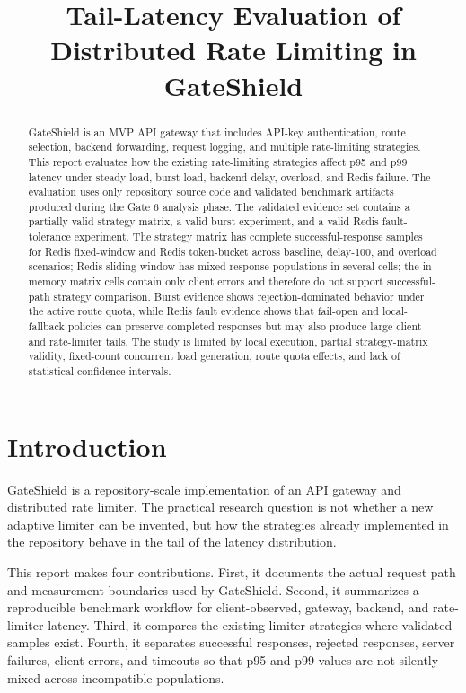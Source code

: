\documentclass[conference]{IEEEtran}
\title{Tail-Latency Evaluation of Distributed Rate Limiting in GateShield}
\author{
\IEEEauthorblockN{Dang Phan Bao Huy}
\IEEEauthorblockA{GateShield MVP API Gateway\\
Repository-based experimental report}
}
\newcommand{\projecturl}{https://github.com/HuyBaoo1/Distributed-System-API-gateway-Dang-Phan-Bao-Huy}
\begin{document}
\maketitle

\begin{center}
\href{\projecturl}{}
\quad
\href{\projecturl/blob/main/README.md}{}
\quad
\href{\projecturl/blob/main/GATESHIELD_GUIDE_VI.md}{}
\end{center}

\begin{abstract}
GateShield is an MVP API gateway that includes API-key authentication, route selection, backend forwarding, request logging, and multiple rate-limiting strategies. This report evaluates how the existing rate-limiting strategies affect p95 and p99 latency under steady load, burst load, backend delay, overload, and Redis failure. The evaluation uses only repository source code and validated benchmark artifacts produced during the Gate 6 analysis phase. The validated evidence set contains a partially valid strategy matrix, a valid burst experiment, and a valid Redis fault-tolerance experiment. The strategy matrix has complete successful-response samples for Redis fixed-window and Redis token-bucket across baseline, delay-100, and overload scenarios; Redis sliding-window has mixed response populations in several cells; the in-memory matrix cells contain only client errors and therefore do not support successful-path strategy comparison. Burst evidence shows rejection-dominated behavior under the active route quota, while Redis fault evidence shows that fail-open and local-fallback policies can preserve completed responses but may also produce large client and rate-limiter tails. The study is limited by local execution, partial strategy-matrix validity, fixed-count concurrent load generation, route quota effects, and lack of statistical confidence intervals.
\end{abstract}

\section{Introduction}
GateShield is a repository-scale implementation of an API gateway and distributed rate limiter. The practical research question is not whether a new adaptive limiter can be invented, but how the strategies already implemented in the repository behave in the tail of the latency distribution.

This report makes four contributions. First, it documents the actual request path and measurement boundaries used by GateShield. Second, it summarizes a reproducible benchmark workflow for client-observed, gateway, backend, and rate-limiter latency. Third, it compares the existing limiter strategies where validated samples exist. Fourth, it separates successful responses, rejected responses, server failures, client errors, and timeouts so that p95 and p99 values are not silently mixed across incompatible populations.
\end{document}
